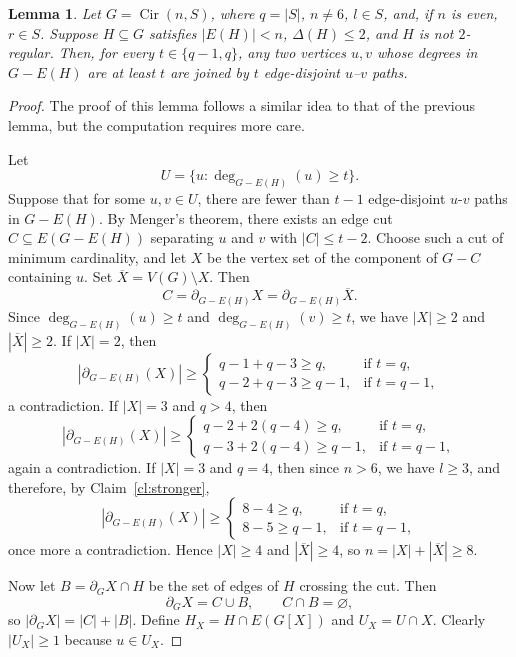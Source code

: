 \documentclass[10pt,a4paper]{amsart}
\newtheorem{lemma}{Lemma}
\begin{document}
\begin{lemma}\label{ML-1002}
Let \(G=\operatorname{Cir}(n,S)\), where \(q=|S|\), \(n\neq 6\), \(l\in S\), and, if \(n\) is even, \(r\in S\). Suppose \(H\subseteq G\) satisfies \(|E(H)|<n\), \(\Delta(H)\le 2\), and \(H\) is not \(2\)-regular. Then, for every \(t\in\{q-1,q\}\), any two vertices \(u,v\) whose degrees in \(G-E(H)\) are at least \(t\) are joined by \(t\) edge-disjoint \(u\)--\(v\) paths.
\end{lemma}

\begin{proof}
The proof of this lemma follows a similar idea to that of the previous lemma, but the computation requires more care. 

Let  
\[
U=\{u:\deg_{G-E(H)}(u)\ge t\}.
\]
Suppose that for some \(u,v\in U\), there are fewer than \(t-1\) edge-disjoint \(u\)-\(v\) paths in \(G-E(H)\). By Menger's theorem, there exists an edge cut \(C\subseteq E(G-E(H))\) separating \(u\) and \(v\) with \(|C|\le t-2\). Choose such a cut of minimum cardinality, and let \(X\) be the vertex set of the component of \(G-C\) containing \(u\). Set $\overline{X}=V(G)\setminus X$. Then
\[
C=\partial_{G-E(H)}X=\partial_{G-E(H)}\overline{X}.
\]
Since \(\deg_{G-E(H)}(u)\ge t\) and \(\deg_{G-E(H)}(v)\ge t\), we have \(|X|\ge 2\) and \(|\overline{X}|\ge 2\). If \(|X|=2\), then
\[
|\partial_{G-E(H)}(X)|\ge
\begin{cases}
q-1+q-3\ge q, & \text{if } t=q,\\[4pt]
q-2+q-3\ge q-1, & \text{if } t=q-1,
\end{cases}
\]
a contradiction. If \(|X|=3\) and \(q>4\), then
\[
|\partial_{G-E(H)}(X)|\ge
\begin{cases}
q-2+2(q-4)\ge q, & \text{if } t=q,\\[4pt]
q-3+2(q-4)\ge q-1, & \text{if } t=q-1,
\end{cases}
\]
again a contradiction. If \(|X|=3\) and \(q=4\), then since \(n>6\), we have \(l\ge 3\), and therefore, by Claim~\ref{cl:stronger},
\[
|\partial_{G-E(H)}(X)|\ge
\begin{cases}
8-4\ge q, & \text{if } t=q,\\[4pt]
8-5\ge q-1, & \text{if } t=q-1,
\end{cases}
\]
once more a contradiction. Hence \(|X|\ge 4\) and \(|\overline{X}|\ge 4\), so \(n=|X|+|\overline{X}|\ge 8\). 

Now let \(B=\partial_G X\cap H\) be the set of edges of \(H\) crossing the cut. Then
\[
\partial_G X=C\cup B,\qquad C\cap B=\varnothing,
\]
so \(|\partial_G X|=|C|+|B|\). Define \(H_X=H\cap E(G[X])\) and \(U_X=U\cap X\). Clearly \(|U_X|\ge 1\) because \(u\in U_X\).


\end{proof}
\end{document}
